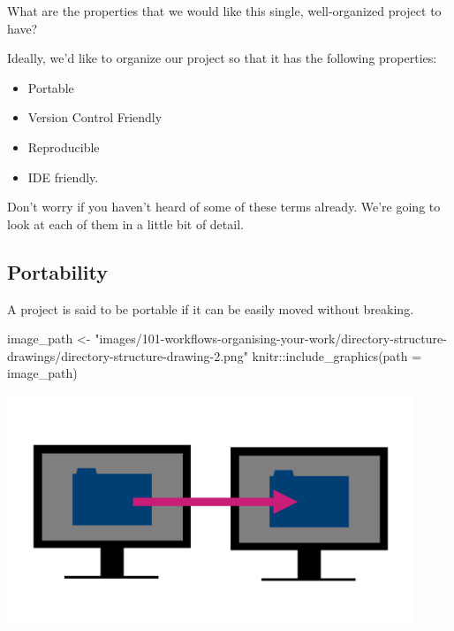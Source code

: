 \documentclass[
  letterpaper,
  DIV=11,
  numbers=noendperiod]{scrreprt}
\newenvironment{Shaded}{\begin{snugshade}}{\end{snugshade}}
\newcommand{\AttributeTok}[1]{\textcolor[rgb]{0.40,0.45,0.13}{#1}}
\newcommand{\FunctionTok}[1]{\textcolor[rgb]{0.28,0.35,0.67}{#1}}
\newcommand{\NormalTok}[1]{\textcolor[rgb]{0.00,0.23,0.31}{#1}}
\newcommand{\OtherTok}[1]{\textcolor[rgb]{0.00,0.23,0.31}{#1}}
\newcommand{\SpecialCharTok}[1]{\textcolor[rgb]{0.37,0.37,0.37}{#1}}
\newcommand{\StringTok}[1]{\textcolor[rgb]{0.13,0.47,0.30}{#1}}
\providecommand{\tightlist}{%
  \setlength{\itemsep}{0pt}\setlength{\parskip}{0pt}}\usepackage{longtable,booktabs,array}
\begin{document}
What are the properties that we would like this single, well-organized
project to have?

Ideally, we'd like to organize our project so that it has the following
properties:

\begin{itemize}
\tightlist
\item
  Portable
\item
  Version Control Friendly
\item
  Reproducible
\item
  IDE friendly.
\end{itemize}

Don't worry if you haven't heard of some of these terms already. We're
going to look at each of them in a little bit of detail.

\subsection{Portability}\label{portability}

A project is said to be portable if it can be easily moved without
breaking.

\begin{Shaded}
\begin{Highlighting}[]
\NormalTok{image\_path }\OtherTok{\textless{}{-}} \StringTok{"images/101{-}workflows{-}organising{-}your{-}work/directory{-}structure{-}drawings/directory{-}structure{-}drawing{-}2.png"}
\NormalTok{knitr}\SpecialCharTok{::}\FunctionTok{include\_graphics}\NormalTok{(}\AttributeTok{path =}\NormalTok{ image\_path)}
\end{Highlighting}
\end{Shaded}

\includegraphics[width=4.8in,height=\textheight]{images/101-workflows-organising-your-work/directory-structure-drawings/directory-structure-drawing-2.png}
\end{document}

